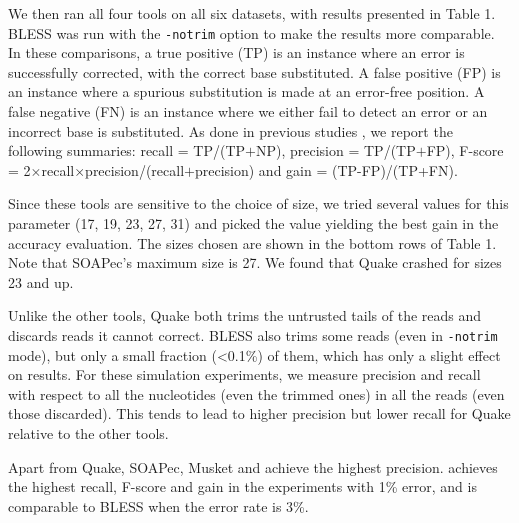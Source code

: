 \documentclass{bmcart}
\begin{document}
We then ran all four tools on all six datasets, with results presented in Table 1.  BLESS was run with the \verb+-notrim+ option to make the results more comparable. In these comparisons, a true positive (TP) is an instance where an error is successfully corrected, \thatis with the correct base substituted.  A false positive (FP) is an instance where a spurious substitution is made at an error-free position.  A false negative (FN) is an instance where we either fail to detect an error or an incorrect base is substituted.  As done in previous studies \cite{liu2013musket}, we report the following summaries: recall = TP/(TP$+$NP), precision = TP/(TP$+$FP), F-score = 2$\times$recall$\times$precision/(recall$+$precision) and gain = (TP-FP)/(TP+FN). 

Since these tools are sensitive to the choice of \kmer size, we tried several values for this parameter (17, 19, 23, 27, 31) and picked the value yielding the best gain in the accuracy evaluation.  The \kmer sizes chosen are shown in the bottom rows of Table 1.  Note that SOAPec's maximum \kmer size is 27.  We found that Quake crashed for \kmer sizes 23 and up.


Unlike the other tools, Quake both trims the untrusted tails of the reads and discards reads it cannot correct. BLESS also trims some reads (even in \verb+-notrim+ mode), but only a small fraction (\textless0.1\%) of them, which has only a slight effect on results.  For these simulation experiments, we measure precision and recall with respect to all the nucleotides (even the trimmed ones) in all the reads (even those discarded).  This tends to lead to higher precision but lower recall for Quake relative to the other tools.


Apart from Quake, SOAPec, Musket and \tool achieve the highest precision.  \tool achieves the highest recall, F-score and gain in the experiments with 1\% error, and is comparable to BLESS when the error rate is 3\%.
\end{document}
